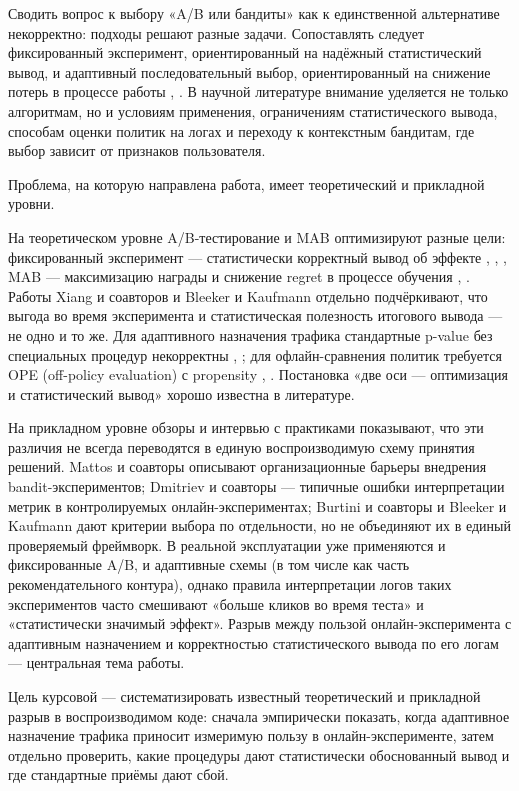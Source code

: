 Сводить вопрос к выбору «A/B или бандиты» как к единственной альтернативе некорректно: подходы решают разные задачи. Сопоставлять следует фиксированный эксперимент, ориентированный на надёжный статистический вывод, и адаптивный последовательный выбор, ориентированный на снижение потерь в процессе работы \cite{ref13}, \cite{ref18,ref19,ref20,ref21}. В научной литературе внимание уделяется не только алгоритмам, но и условиям применения, ограничениям статистического вывода, способам оценки политик на логах и переходу к контекстным бандитам, где выбор зависит от признаков пользователя.

Проблема, на которую направлена работа, имеет теоретический и прикладной уровни.

На теоретическом уровне A/B-тестирование и MAB оптимизируют разные цели: фиксированный эксперимент --- статистически корректный вывод об эффекте \cite{ref5}, \cite{ref19}, \cite{ref20}, MAB --- максимизацию награды и снижение regret в процессе обучения \cite{ref12}, \cite{ref13}. Работы Xiang и соавторов \cite{ref21} и Bleeker и Kaufmann \cite{ref22} отдельно подчёркивают, что выгода во время эксперимента и статистическая полезность итогового вывода --- не одно и то же. Для адаптивного назначения трафика стандартные p-value без специальных процедур некорректны \cite{ref19}, \cite{ref20}; для офлайн-сравнения политик требуется OPE (off-policy evaluation) с propensity \cite{ref6}, \cite{ref24}. Постановка «две оси --- оптимизация и статистический вывод» хорошо известна в литературе.

На прикладном уровне обзоры и интервью с практиками показывают, что эти различия не всегда переводятся в единую воспроизводимую схему принятия решений. Mattos и соавторы \cite{ref18} описывают организационные барьеры внедрения bandit-экспериментов; Dmitriev и соавторы \cite{ref11} --- типичные ошибки интерпретации метрик в контролируемых онлайн-экспериментах; Burtini и соавторы \cite{ref13} и Bleeker и Kaufmann \cite{ref22} дают критерии выбора по отдельности, но не объединяют их в единый проверяемый фреймворк. В реальной эксплуатации уже применяются и фиксированные A/B, и адаптивные схемы (в том числе как часть рекомендательного контура), однако правила интерпретации логов таких экспериментов часто смешивают «больше кликов во время теста» и «статистически значимый эффект». Разрыв между пользой онлайн-эксперимента с адаптивным назначением и корректностью статистического вывода по его логам --- центральная тема работы.

Цель курсовой --- систематизировать известный теоретический и прикладной разрыв в воспроизводимом коде: сначала эмпирически показать, когда адаптивное назначение трафика приносит измеримую пользу в онлайн-эксперименте, затем отдельно проверить, какие процедуры дают статистически обоснованный вывод и где стандартные приёмы дают сбой. 

